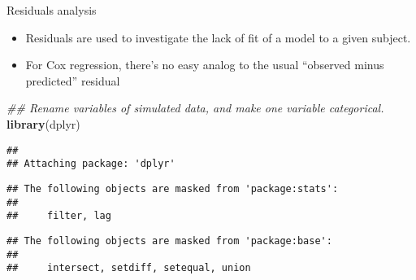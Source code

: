 \documentclass[
  ignorenonframetext,
]{beamer}
\newenvironment{Shaded}{\begin{snugshade}}{\end{snugshade}}
\newcommand{\CommentTok}[1]{\textcolor[rgb]{0.56,0.35,0.01}{\textit{#1}}}
\newcommand{\DataTypeTok}[1]{\textcolor[rgb]{0.13,0.29,0.53}{#1}}
\newcommand{\DecValTok}[1]{\textcolor[rgb]{0.00,0.00,0.81}{#1}}
\newcommand{\FloatTok}[1]{\textcolor[rgb]{0.00,0.00,0.81}{#1}}
\newcommand{\KeywordTok}[1]{\textcolor[rgb]{0.13,0.29,0.53}{\textbf{#1}}}
\newcommand{\NormalTok}[1]{#1}
\newcommand{\OperatorTok}[1]{\textcolor[rgb]{0.81,0.36,0.00}{\textbf{#1}}}
\newcommand{\OtherTok}[1]{\textcolor[rgb]{0.56,0.35,0.01}{#1}}
\newcommand{\StringTok}[1]{\textcolor[rgb]{0.31,0.60,0.02}{#1}}
\providecommand{\tightlist}{%
  \setlength{\itemsep}{0pt}\setlength{\parskip}{0pt}}
\begin{document}
\begin{frame}[fragile]{Residuals analysis}
\protect\hypertarget{residuals-analysis}{}

\begin{itemize}
\tightlist
\item
  Residuals are used to investigate the lack of fit of a model to a
  given subject.
\item
  For Cox regression, there's no easy analog to the usual ``observed
  minus predicted'' residual
\end{itemize}

\footnotesize

\begin{Shaded}
\end{Shaded}

\begin{Shaded}
\begin{Highlighting}[]
\CommentTok{## Rename variables of simulated data, and make one variable categorical.}
\KeywordTok{library}\NormalTok{(dplyr)}
\end{Highlighting}
\end{Shaded}

\begin{verbatim}
## 
## Attaching package: 'dplyr'
\end{verbatim}

\begin{verbatim}
## The following objects are masked from 'package:stats':
## 
##     filter, lag
\end{verbatim}

\begin{verbatim}
## The following objects are masked from 'package:base':
## 
##     intersect, setdiff, setequal, union
\end{verbatim}


\end{frame}
\end{document}
